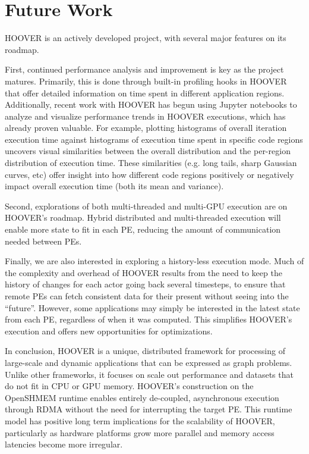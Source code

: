 \section{Future Work}

HOOVER is an actively developed project, with several major features on its
roadmap.

First, continued performance analysis and improvement is key as the project
matures. Primarily, this is done through built-in profiling hooks in HOOVER
that offer detailed information on time spent in different application regions.
Additionally, recent work with HOOVER has begun using Jupyter notebooks to
analyze and visualize performance trends in HOOVER executions, which has already
proven valuable. For example, plotting histograms of overall iteration execution
time against histograms of execution time spent in specific code regions
uncovers visual similarities between the overall distribution and the per-region
distribution of execution time. These similarities (e.g. long tails, sharp
Gaussian curves, etc) offer insight into how different code regions positively
or negatively impact overall execution time (both its mean and variance).

Second, explorations of both multi-threaded and multi-GPU execution are on
HOOVER's roadmap. Hybrid distributed and multi-threaded execution will enable
more state to fit in each PE, reducing the amount of communication needed
between PEs.

Finally, we are also interested in exploring a history-less execution mode.
Much of the complexity and overhead of HOOVER results from the need to keep
the history of changes for each actor going back several timesteps, to ensure
that remote PEs can fetch consistent data for their present without seeing into
the ``future''. However, some applications may simply be interested in the
latest state from each PE, regardless of when it was computed. This
simplifies HOOVER's execution and offers new opportunities for optimizations.

In conclusion, HOOVER is a unique, distributed framework for processing of
large-scale and dynamic applications that can be expressed as graph
problems. Unlike other frameworks, it focuses on scale out performance and
datasets that do not fit in CPU or GPU memory. HOOVER's construction on the
OpenSHMEM runtime enables entirely de-coupled, asynchronous execution through
RDMA without the need for interrupting the target PE. This runtime model has
positive long term implications for the scalability of HOOVER, particularly
as hardware platforms grow more parallel and memory access latencies become more
irregular.
